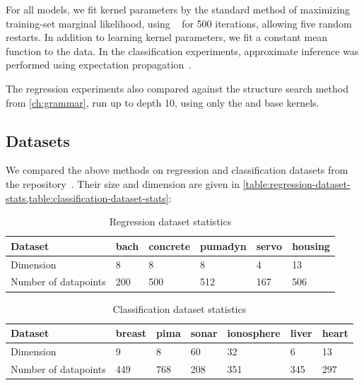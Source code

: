For all \gp{} models, we fit kernel parameters by the standard method of maximizing training-set marginal likelihood, using \LBFGS{}~\citep{nocedal1980updating} for 500 iterations, allowing five random restarts.
In addition to learning kernel parameters, we fit a constant mean function to the data.
In the classification experiments, approximate \gp{} inference was performed using expectation propagation~\citep{minka2001expectation}.

The regression experiments also compared against the structure search method from \cref{ch:grammar}, run up to depth 10, using only the \SE{} and \RQ{} base kernels.



\subsection{Datasets}
\label{sec:additive-datasets}
We compared the above methods on regression and classification datasets from the \UCI{} repository~\citep{UCI}.
Their size and dimension are given in \cref{table:regression-dataset-stats,table:classification-dataset-stats}:

\begin{table}[h]
\caption{Regression dataset statistics}
\label{tbl:Regression Dataset Statistics}
\begin{center}
\begin{tabular}{l | lllll}
Dataset & bach & concrete & pumadyn & servo & housing \\ \hline
Dimension      & 8    & 8        & 8       & 4     & 13 \\
Number of datapoints       & 200  & 500      & 512     & 167   & 506
\end{tabular}
\end{center}
\label{table:regression-dataset-stats}
\end{table}
%
\begin{table}[h]
\caption{Classification dataset statistics}
\label{tbl:Classification Dataset Statistics}
\begin{center}
\begin{tabular}{l | llllll}
Dataset & breast & pima & sonar & ionosphere & liver & heart\\ \hline
Dimension      & 9      & 8    & 60    & 32         & 6     & 13 \\
Number of datapoints      & 449    & 768  & 208   & 351        & 345   & 297
\end{tabular}
\end{center}
\label{table:classification-dataset-stats}
\end{table}

